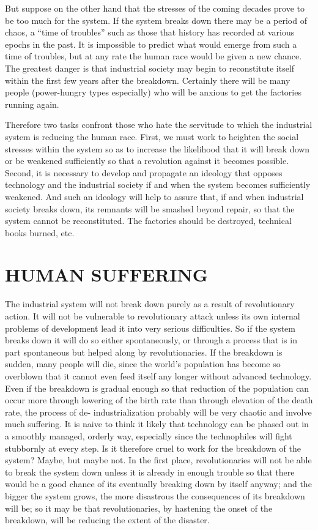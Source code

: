  But suppose on the other hand that the stresses of the coming decades prove to be too much for the system. If the system breaks down there may be a period of chaos, a “time of troubles” such as those that history has recorded at various epochs in the past. It is impossible to predict what would emerge from such a time of troubles, but at any rate the human race would be given a new chance. The greatest danger is that industrial society may begin to reconstitute itself within the first few years after the breakdown. Certainly there will be many people (power-hungry types especially) who will be anxious to get the factories running again.

 Therefore two tasks confront those who hate the servitude to which the industrial system is reducing the human race. First, we must work to heighten the social stresses within the system so as to increase the likelihood that it will break down or be weakened sufficiently so that a revolution against it becomes possible. Second, it is necessary to develop and propagate an ideology that opposes technology and the industrial society if and when the system becomes sufficiently weakened. And such an ideology will help to assure that, if and when industrial society breaks down, its remnants will be smashed beyond repair, so that the system cannot be reconstituted. The factories should be destroyed, technical books burned, etc.

\chapter{HUMAN SUFFERING}

 The industrial system will not break down purely as a result of revolutionary action. It will not be vulnerable to revolutionary attack unless its own internal problems of development lead it into very serious difficulties. So if the system breaks down it will do so either spontaneously, or through a process that is in part spontaneous but helped along by revolutionaries. If the breakdown is sudden, many people will die, since the world’s population has become so overblown that it cannot even feed itself any longer without advanced technology. Even if the breakdown is gradual enough so that reduction of the population can occur more through lowering of the birth rate than through elevation of the death rate, the process of de- industrialization probably will be very chaotic and involve much suffering. It is naive to think it likely that technology can be phased out in a smoothly managed, orderly way, especially since the technophiles will fight stubbornly at every step. Is it therefore cruel to work for the breakdown of the system? Maybe, but maybe not. In the first place, revolutionaries will not be able to break the system down unless it is already in enough trouble so that there would be a good chance of its eventually breaking down by itself anyway; and the bigger the system grows, the more disastrous the consequences of its breakdown will be; so it may be that revolutionaries, by hastening the onset of the breakdown, will be reducing the extent of the disaster.

